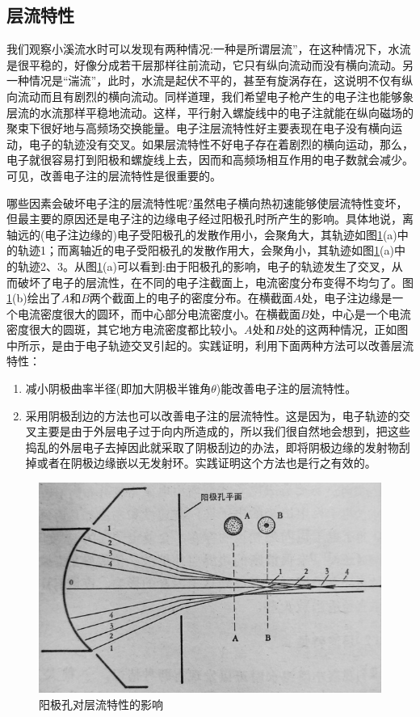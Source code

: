 \subsection{层流特性}

我们观察小溪流水时可以发现有两种情况:一种是所谓层流”，在这种情况下，水流是很平稳的，好像分成若干层那样往前流动，它只有纵向流动而没有横向流动。另一种情况是“湍流”，此时，水流是起伏不平的，甚至有旋涡存在，这说明不仅有纵向流动而且有剧烈的横向流动。同样道理，我们希望电子枪产生的电子注也能够象层流的水流那样平稳地流动。这样，平行射入螺旋线中的电子注就能在纵向磁场的聚束下很好地与高频场交换能量。电子注层流特性好主要表现在电子没有横向运动，电子的轨迹没有交叉。如果层流特性不好电子存在着剧烈的横向运动，那么，电子就很容易打到阳极和螺旋线上去，因而和高频场相互作用的电子数就会减少。可见，改善电子注的层流特性是很重要的。

哪些因素会破坏电子注的层流特性呢?虽然电子横向热初速能够使层流特性变坏，但最主要的原因还是电子注的边缘电子经过阳极孔时所产生的影响。具体地说，离轴远的(电子注边缘的)电子受阳极孔的发散作用小，会聚角大，其轨迹如图\ref{ch6-8}(a)中的轨迹1；而离轴近的电子受阳极孔的发散作用大，会聚角小，其轨迹如图\ref{ch6-8}(a)中的轨迹2、3。从图\ref{ch6-8}(a)可以看到:由于阳极孔的影响，电子的轨迹发生了交叉，从而破坏了电子的层流性，在不同的电子注截面上，电流密度分布变得不均匀了。图\ref{ch6-8}(b)绘出了$ A $和$ B $两个截面上的电子的密度分布。在横截面$ A $处，电子注边缘是一个电流密度很大的圆环，而中心部分电流密度小。在横截面$ B $处，中心是一个电流密度很大的圆斑，其它地方电流密度都比较小。$ A $处和$ B $处的这两种情况，正如图中所示，是由于电子轨迹交叉引起的。实践证明，利用下面两种方法可以改善层流特性：

\begin{enumerate}
	\item 减小阴极曲率半径(即加大阴极半锥角$ \theta $)能改善电子注的层流特性。
	\item 采用阴极刮边的方法也可以改善电子注的层流特性。这是因为，电子轨迹的交叉主要是由于外层电子过于向内所造成的，所以我们很自然地会想到，把这些捣乱的外层电子去掉因此就采取了阴极刮边的办法，即将阴极边缘的发射物刮掉或者在阴极边缘嵌以无发射环。实践证明这个方法也是行之有效的。
\end{enumerate}


\begin{figure}[phtb]
	\centering
	\includegraphics[width=0.85\linewidth]{figure/ch6-8}
	\caption{阳极孔对层流特性的影响}
	\label{ch6-8}
\end{figure}